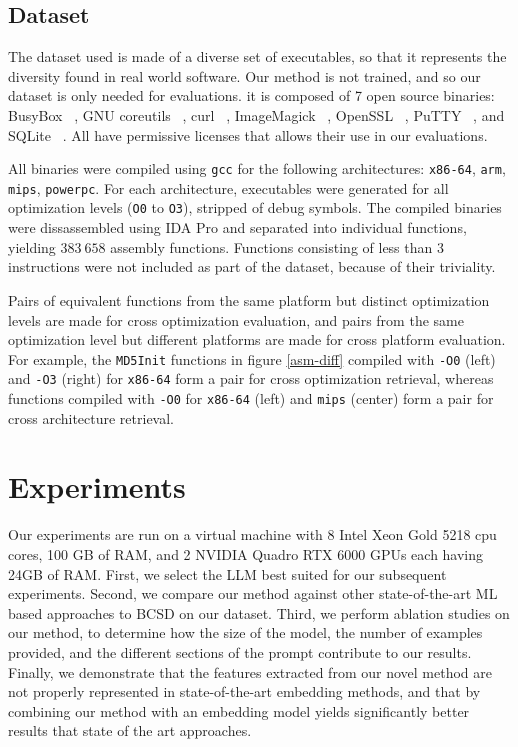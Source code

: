 \subsection{Dataset}

The dataset used is made of a diverse set of executables, so that it represents the diversity found in real world software.
Our method is not trained, and so our dataset is only needed for evaluations. it is composed of 7 open source binaries:
BusyBox ~\cite{busybox}, GNU coreutils ~\cite{coreutils}, curl ~\cite{curl}, ImageMagick ~\cite{image-magick}, OpenSSL ~\cite{openssl},
PuTTY ~\cite{putty}, and SQLite ~\cite{sqlite}. All have permissive licenses that allows their use in our evaluations. 

All binaries were compiled using \texttt{gcc} for the following architectures: \texttt{x86-64}, \texttt{arm}, \texttt{mips}, \texttt{powerpc}.
For each architecture, executables were generated for all optimization levels (\texttt{O0} to \texttt{O3}), stripped of debug symbols.
The compiled binaries were dissassembled using IDA Pro and separated into individual functions, yielding \(383\ 658\) assembly functions.
Functions consisting of less than 3 instructions were not included as part of the dataset, because of their triviality.

Pairs of equivalent functions from the same platform but distinct optimization levels are made for cross optimization
evaluation, and pairs from the same optimization level but different platforms are made for cross
platform evaluation. For example, the \texttt{MD5Init} functions in figure \ref{asm-diff} compiled with \texttt{-O0} (left) and
\texttt{-O3} (right) for \texttt{x86-64} form a pair for cross optimization retrieval, whereas functions compiled with \texttt{-O0}
for \texttt{x86-64} (left) and \texttt{mips} (center) form a pair for cross architecture retrieval.

\section{Experiments}

Our experiments are run on a virtual machine with 8 Intel Xeon Gold 5218 cpu cores, 100 GB of RAM, and 2 NVIDIA Quadro RTX
6000 GPUs each having  24GB of RAM. First, we select the LLM best suited for our subsequent experiments. Second, we compare our
method against other state-of-the-art ML based approaches to BCSD on our dataset. Third, we perform ablation studies on our method,
to determine how the size of the model, the number of examples provided, and the different sections of the prompt contribute to our results.
Finally, we demonstrate that the features extracted from our novel method are not properly represented in state-of-the-art embedding methods,
and that by combining our method with an embedding model yields significantly better results that state of the art approaches.

